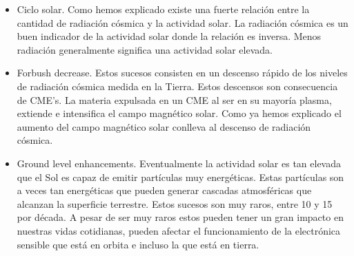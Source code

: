 \begin{itemize}
	\item	Ciclo solar. Como hemos explicado existe una fuerte relación entre la cantidad de radiación cósmica y la actividad solar. La radiación
		cósmica es un buen indicador de la actividad solar donde la relación es inversa. Menos radiación generalmente significa una actividad
		solar elevada.
	\item	Forbush decrease\cite{Forbush1938}. Estos sucesos consisten en un descenso rápido de los niveles de radiación cósmica medida en la
		Tierra. Estos descensos son consecuencia de CME's. La materia expulsada en un CME al ser en su mayoría plasma, extiende e intensifica
		el campo magnético solar. Como ya hemos explicado el aumento del campo magnético solar conlleva al descenso de radiación cósmica.
	\item	Ground level enhancements. Eventualmente la actividad solar es tan elevada que el Sol es capaz de emitir partículas muy energéticas.
		Estas partículas son a veces tan energéticas que pueden generar cascadas atmosféricas que alcanzan la superficie terrestre. Estos
		sucesos son muy raros, entre 10 y 15 por década. A pesar de ser muy raros estos pueden tener un gran impacto en nuestras vidas
		cotidianas, pueden afectar el funcionamiento de la electrónica sensible que está en orbita e incluso la que está en tierra.   
\end{itemize}

